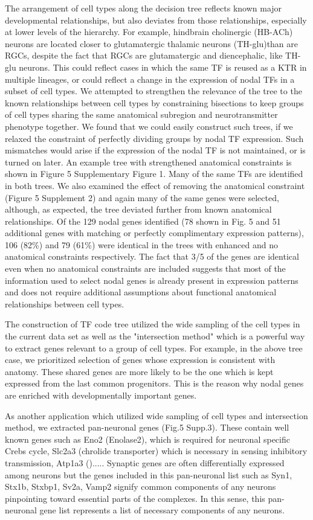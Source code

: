 The arrangement of cell types along the decision tree reflects known major developmental relationships, but also deviates from those relationships, especially at lower levels of the hierarchy. For example, hindbrain cholinergic (HB-ACh) neurons are located closer to glutamatergic thalamic neurons (TH-glu)than are RGCs, despite the fact that RGCs are glutamatergic and diencephalic, like TH-glu neurons. This could reflect cases in which the same TF is reused as a KTR in multiple lineages, or could reflect a change in the expression of nodal TFs in a subset of cell types. We attempted to strengthen the relevance of the tree to the known relationships between cell types by constraining bisections to keep groups of cell types sharing the same anatomical subregion and neurotransmitter phenotype together. We found that we could easily construct such trees, if we relaxed the constraint of perfectly dividing groups by nodal TF expression. Such mismatches would arise if the expression of the nodal TF is not maintained, or is turned on later. An example tree with strengthened anatomical constraints is shown in Figure 5 Supplementary Figure 1. Many of the same TFs are identified in both trees. We also examined the effect of removing the anatomical constraint (Figure 5 Supplement 2) and again many of the same genes were selected, although, as expected, the tree deviated further from known anatomical relationships. Of the 129 nodal genes identified (78 shown in Fig. 5 and 51 additional genes with matching or perfectly complimentary expression patterns), 106 (82\%) and 79 (61\%) were identical in the trees with enhanced and no anatomical constraints respectively. The fact that 3/5 of the genes are identical even when no anatomical constraints are included suggests that most of the information used to select nodal genes is already present in expression patterns and does not require additional assumptions about functional anatomical relationships between cell types.

The construction of TF code tree utilized the wide sampling of the cell types in the current data set as well as the "intersection method" which is a powerful way to extract genes relevant to a group of cell types. For example, in the above tree case, we prioritized selection of genes whose expression is consistent with anatomy. These shared genes are more likely to be the one which is kept expressed from the last common progenitors. This is the reason why nodal genes are enriched with developmentally important genes.

As another application which utilized wide sampling of cell types and intersection method, we  extracted pan-neuronal genes (Fig.5 Supp.3). These contain well known genes such as Eno2 (Enolase2), which is required for neuronal specific Crebs cycle, Slc2a3 (chrolide transporter) which is necessary in sensing inhibitory transmission, Atp1a3 ().....  Synaptic genes are often differentially expressed among neurons but the genes included in this pan-neuronal list such as Syn1, Stx1b, Stxbp1, Sv2a, Vamp2 signify common components of any neurons pinpointing toward essential parts of the complexes. In this sense, this pan-neuronal gene list represents a list of necessary components of any neurons.


